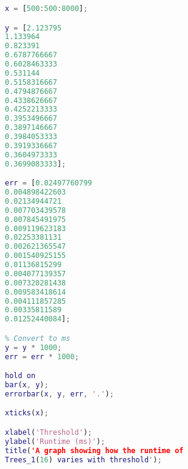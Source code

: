 \documentclass[12pt,a4paper,twoside,openright]{report}
\begin{document}
\begin{figure*}
\begin{lstlisting}[language=Matlab, caption=Matlab script for Trees runtime graph w.r.t. threshold, label={lst:treesbenchthresh}]
x = [500:500:8000];

y = [2.123795
1.133964
0.823391
0.6787766667
0.6028463333
0.531144
0.5158316667
0.4794876667
0.4338626667
0.4252213333
0.3953496667
0.3897146667
0.3984053333
0.3919336667
0.3604973333
0.3699083333];

err = [0.02497760799
0.004898422603
0.02134944721
0.007703439578
0.007845491975
0.009119623183
0.02253381131
0.002621365547
0.001540925155
0.01136815299
0.004077139357
0.007320281438
0.009583418614
0.004111857285
0.00335811589
0.01252440084];

% Convert to ms
y = y * 1000;
err = err * 1000;

hold on
bar(x, y);
errorbar(x, y, err, '.');

xticks(x);

xlabel('Threshold');
ylabel('Runtime (ms)');
title('A graph showing how the runtime of 
Trees_1(16) varies with threshold');
\end{lstlisting}
\end{figure*}
\end{document}
